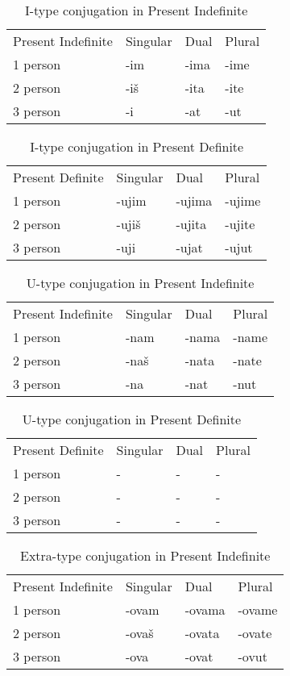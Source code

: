 \begin{table}[!htpb]
	\caption{I-type conjugation in Present Indefinite}
	\begin{tabular}{llll}
		Present Indefinite & Singular & Dual & Plural \\
		1 person & -im & -ima & -ime \\
		2 person & -iš & -ita & -ite \\
		3 person & -i & -at & -ut
	\end{tabular}
\end{table}


\begin{table}[!htpb]
	\caption{I-type conjugation in Present Definite}
	\begin{tabular}{llll}
		Present Definite & Singular & Dual & Plural \\
		1 person & -ujim & -ujima & -ujime \\
		2 person & -ujiš & -ujita & -ujite \\
		3 person & -uji & -ujat & -ujut
	\end{tabular}
\end{table}


\begin{table}[!htpb]
	\caption{U-type conjugation in Present Indefinite}
	\begin{tabular}{llll}
		Present Indefinite & Singular & Dual & Plural \\
		1 person & -nam & -nama & -name \\
		2 person & -naš & -nata & -nate \\
		3 person & -na & -nat & -nut
	\end{tabular}
\end{table}


\begin{table}[!hhtpb]
	\caption{U-type conjugation in Present Definite}
	\begin{tabular}{llll}
		Present Definite & Singular & Dual & Plural \\
		1 person & - & - & - \\
		2 person & - & - & - \\
		3 person & - & - & -
	\end{tabular}
\end{table}

\begin{table}[!htpb]
	\caption{Extra-type conjugation in Present Indefinite}
	\begin{tabular}{llll}
		Present Indefinite & Singular & Dual & Plural \\
		1 person & -ovam & -ovama & -ovame \\
		2 person & -ovaš & -ovata & -ovate \\
		3 person & -ova & -ovat & -ovut
	\end{tabular}
\end{table}


